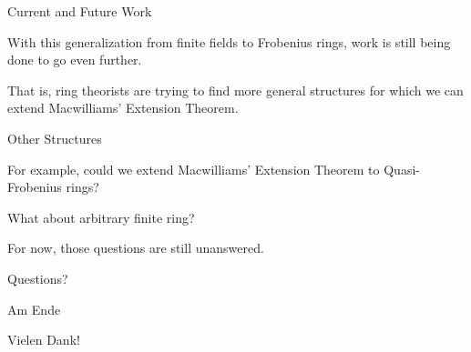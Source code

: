 \documentclass{beamer}
\begin{document}
\begin{frame}{Current and Future Work}

    With this generalization from finite fields to Frobenius rings, work is still being done to go even
    further.

    \bigskip

    That is, ring theorists are trying to find more general structures for which we can extend
    Macwilliams' Extension Theorem.
    
\end{frame}

\begin{frame}{Other Structures}
    
    For example, could we extend Macwilliams' Extension Theorem to Quasi-Frobenius rings?

    \bigskip

    What about arbitrary finite ring?

    \bigskip

    \pause

    For now, those questions are still unanswered.

\end{frame}

\begin{frame}

    \begin{center}
        Questions?
    \end{center}

\end{frame}

\begin{frame}{Am Ende}

    \begin{center}
        Vielen Dank!
    \end{center}

\end{frame}
\end{document}
